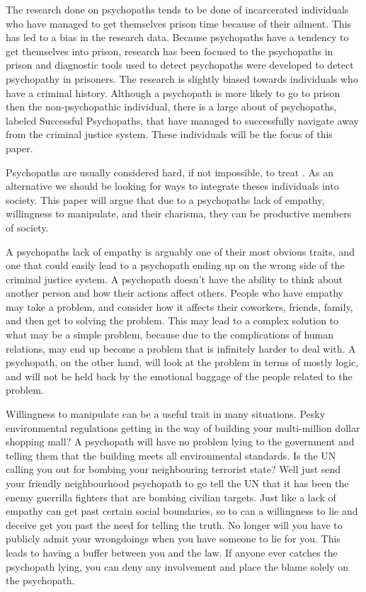 \documentclass[12pt,jou]{apa}
\begin{document}
The research done on psychopaths tends to be done of incarcerated individuals
who have managed to get themselves prison time because of their ailment. This
has led to a bias in the research data. Because psychopaths have a tendency to
get themselves into prison, research has been focused to the psychopaths in
prison and diagnostic tools used to detect psychopaths were developed to detect
psychopathy in prisoners. The research is slightly biased towards individuals
who have a criminal history. Although a psychopath is more likely to go to
prison then the non-psychopathic individual, there is a large about of
psychopaths, labeled Successful Psychopaths, that have managed to successfully
navigate away from the criminal justice system. These individuals will be the
focus of this paper. 

Psychopaths are usually considered hard, if not impossible, to treat
\cite{crimpsych}. As an alternative we should be looking for ways to integrate
theses individuals into society. This paper will argue that due to a psychopaths
lack of empathy, willingness to manipulate, and their charisma, they can be
productive members of society.

A psychopaths lack of empathy is arguably one of their most obvious traits,
and one that could easily lead to a psychopath ending up on the wrong side of
the criminal justice system. A psychopath doesn't have the ability to think
about another person and how their actions affect others. People who have
empathy may take a problem, and consider how it affects their coworkers, friends,
family, and then get to solving the problem. This may lead to a complex solution
to what may be a simple problem, because due to the complications of human
relations, may end up become a problem that is infinitely harder to deal with. A
psychopath, on the other hand, will look at the problem in terms of mostly
logic, and will not be held back by the emotional baggage of the people related
to the problem. %

Willingness to manipulate can be a useful trait in many situations. Pesky
environmental regulations getting in the way of building your multi-million dollar
shopping mall? A psychopath will have no problem lying to the government and
telling them that the building meets all environmental standards. Is the UN
calling you out for bombing your neighbouring terrorist state? Well just send
your friendly neighbourhood psychopath to go tell the UN that it has been the
enemy guerrilla fighters that are bombing civilian targets. Just like a lack of
empathy can get past certain social boundaries, so to can a willingness to lie
and deceive get you past the need for telling the truth. No longer will you have
to publicly admit your wrongdoings when you have someone to lie for you. This
leads to having a buffer between you and the law. If anyone ever catches the
psychopath lying, you can deny any involvement and place the blame solely on the
psychopath. 
\end{document}
